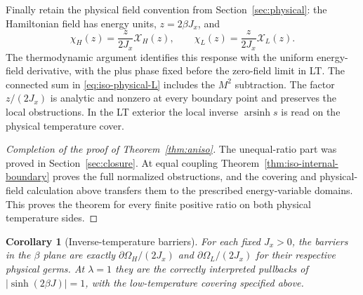 \documentclass[11pt]{article}
\numberwithin{equation}{section}
\newtheorem{corollary}[theorem]{Corollary}
\theoremstyle{definition}
\newcommand{\OH}{\Omega_H}
\newcommand{\OL}{\Omega_L}
\begin{document}
Finally retain the physical field convention from
Section~\ref{sec:physical}: the Hamiltonian field has energy units,
$z=2\beta J_x$, and
\[
 \chi_H(z)=\frac{z}{2J_x}\mathcal X_H(z),\qquad
 \chi_L(z)=\frac{z}{2J_x}\mathcal X_L(z).
\]
The thermodynamic argument identifies this response with the uniform
energy-field derivative, with the plus phase fixed before the
zero-field limit in LT. The connected sum in
\eqref{eq:iso-physical-L} includes the $M^2$ subtraction.
The factor $z/(2J_x)$ is analytic and nonzero at every boundary
point and preserves the local obstructions. In the LT exterior
the local inverse $\operatorname{arsinh}s$ is read on the physical
temperature cover.


\begin{proof}[Completion of the proof of Theorem~\ref{thm:aniso}]
The unequal-ratio part was proved in Section~\ref{sec:closure}.
At equal coupling Theorem~\ref{thm:iso-internal-boundary} proves
the full normalized obstructions, and the covering and
physical-field calculation above transfers them to the prescribed
energy-variable domains. This proves the theorem for every finite
positive ratio on both physical temperature sides.
\end{proof}

\begin{corollary}[Inverse-temperature barriers]\label{cor:alllambda}
For each fixed $J_x>0$, the barriers in the $\beta$ plane are exactly
$\partial\OH/(2J_x)$ and $\partial\OL/(2J_x)$ for their respective
physical germs. At $\lambda=1$ they are the correctly interpreted
pullbacks of $|\sinh(2\beta J)|=1$, with the low-temperature covering
specified above.
\end{corollary}
\end{document}
